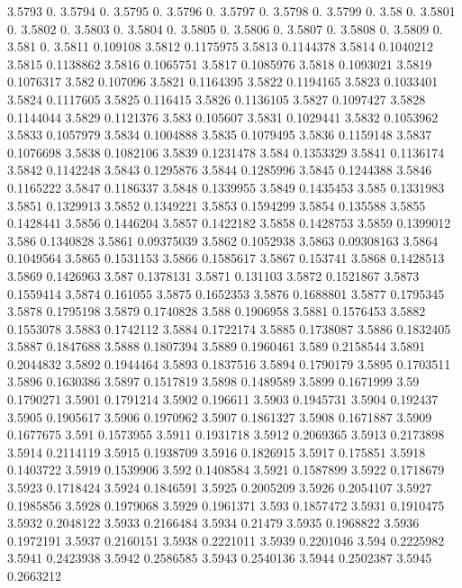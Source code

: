 3.5793  0.
3.5794  0.
3.5795  0.
3.5796  0.
3.5797  0.
3.5798  0.
3.5799  0.
3.58  0.
3.5801  0.
3.5802  0.
3.5803  0.
3.5804  0.
3.5805  0.
3.5806  0.
3.5807  0.
3.5808  0.
3.5809  0.
3.581  0.
3.5811  0.109108
3.5812  0.1175975
3.5813  0.1144378
3.5814  0.1040212
3.5815  0.1138862
3.5816  0.1065751
3.5817  0.1085976
3.5818  0.1093021
3.5819  0.1076317
3.582  0.107096
3.5821  0.1164395
3.5822  0.1194165
3.5823  0.1033401
3.5824  0.1117605
3.5825  0.116415
3.5826  0.1136105
3.5827  0.1097427
3.5828  0.1144044
3.5829  0.1121376
3.583  0.105607
3.5831  0.1029441
3.5832  0.1053962
3.5833  0.1057979
3.5834  0.1004888
3.5835  0.1079495
3.5836  0.1159148
3.5837  0.1076698
3.5838  0.1082106
3.5839  0.1231478
3.584  0.1353329
3.5841  0.1136174
3.5842  0.1142248
3.5843  0.1295876
3.5844  0.1285996
3.5845  0.1244388
3.5846  0.1165222
3.5847  0.1186337
3.5848  0.1339955
3.5849  0.1435453
3.585  0.1331983
3.5851  0.1329913
3.5852  0.1349221
3.5853  0.1594299
3.5854  0.135588
3.5855  0.1428441
3.5856  0.1446204
3.5857  0.1422182
3.5858  0.1428753
3.5859  0.1399012
3.586  0.1340828
3.5861  0.09375039
3.5862  0.1052938
3.5863  0.09308163
3.5864  0.1049564
3.5865  0.1531153
3.5866  0.1585617
3.5867  0.153741
3.5868  0.1428513
3.5869  0.1426963
3.587  0.1378131
3.5871  0.131103
3.5872  0.1521867
3.5873  0.1559414
3.5874  0.161055
3.5875  0.1652353
3.5876  0.1688801
3.5877  0.1795345
3.5878  0.1795198
3.5879  0.1740828
3.588  0.1906958
3.5881  0.1576453
3.5882  0.1553078
3.5883  0.1742112
3.5884  0.1722174
3.5885  0.1738087
3.5886  0.1832405
3.5887  0.1847688
3.5888  0.1807394
3.5889  0.1960461
3.589  0.2158544
3.5891  0.2044832
3.5892  0.1944464
3.5893  0.1837516
3.5894  0.1790179
3.5895  0.1703511
3.5896  0.1630386
3.5897  0.1517819
3.5898  0.1489589
3.5899  0.1671999
3.59  0.1790271
3.5901  0.1791214
3.5902  0.196611
3.5903  0.1945731
3.5904  0.192437
3.5905  0.1905617
3.5906  0.1970962
3.5907  0.1861327
3.5908  0.1671887
3.5909  0.1677675
3.591  0.1573955
3.5911  0.1931718
3.5912  0.2069365
3.5913  0.2173898
3.5914  0.2114119
3.5915  0.1938709
3.5916  0.1826915
3.5917  0.175851
3.5918  0.1403722
3.5919  0.1539906
3.592  0.1408584
3.5921  0.1587899
3.5922  0.1718679
3.5923  0.1718424
3.5924  0.1846591
3.5925  0.2005209
3.5926  0.2054107
3.5927  0.1985856
3.5928  0.1979068
3.5929  0.1961371
3.593  0.1857472
3.5931  0.1910475
3.5932  0.2048122
3.5933  0.2166484
3.5934  0.21479
3.5935  0.1968822
3.5936  0.1972191
3.5937  0.2160151
3.5938  0.2221011
3.5939  0.2201046
3.594  0.2225982
3.5941  0.2423938
3.5942  0.2586585
3.5943  0.2540136
3.5944  0.2502387
3.5945  0.2663212
